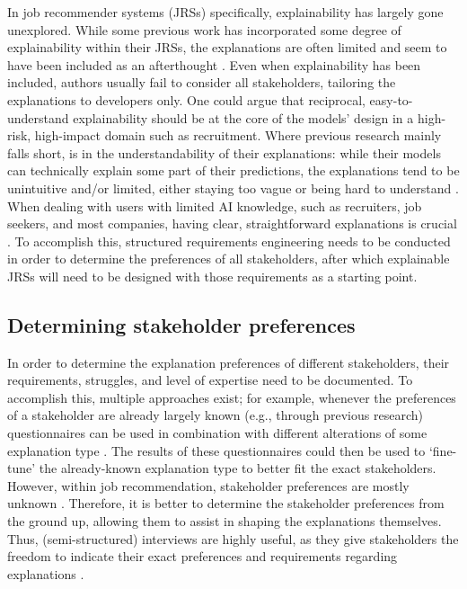 In job recommender systems (JRSs) specifically, explainability has largely gone unexplored. While some previous work has incorporated some degree of explainability within their JRSs, the explanations are often limited and seem to have been included as an afterthought \cite{le2019towards,Upadhyay2021,yildirim2021bideepfm}. Even when explainability has been included, authors usually fail to consider all stakeholders, tailoring the explanations to developers only. One could argue that reciprocal, easy-to-understand explainability should be at the core of the models' design in a high-risk, high-impact domain such as recruitment. Where previous research mainly falls short, is in the understandability of their explanations: while their models can technically explain some part of their predictions, the explanations tend to be unintuitive and/or limited, either staying too vague \cite{le2019towards,Upadhyay2021} or being hard to understand \cite{yildirim2021bideepfm}. When dealing with users with limited AI knowledge, such as recruiters, job seekers, and most companies, having clear, straightforward explanations is crucial \cite{schellingerhout2022explainable,szymanski2021visual}. To accomplish this, structured requirements engineering needs to be conducted in order to determine the preferences of all stakeholders, after which explainable JRSs will need to be designed with those requirements as a starting point. 

\subsection{Determining stakeholder preferences}
In order to determine the explanation preferences of different stakeholders, their requirements, struggles, and level of expertise need to be documented. To accomplish this, multiple approaches exist; for example, whenever the preferences of a stakeholder are already largely known (e.g., through previous research) questionnaires can be used in combination with different alterations of some explanation type \cite{szymanski2021visual}. The results of these questionnaires could then be used to `fine-tune' the already-known explanation type to better fit the exact stakeholders. However, within job recommendation, stakeholder preferences are mostly unknown \cite{de2021job}. Therefore, it is better to determine the stakeholder preferences from the ground up, allowing them to assist in shaping the explanations themselves. Thus, (semi-structured) interviews are highly useful, as they give stakeholders the freedom to indicate their exact preferences and requirements regarding explanations \cite{longhurst2003semi}. 

